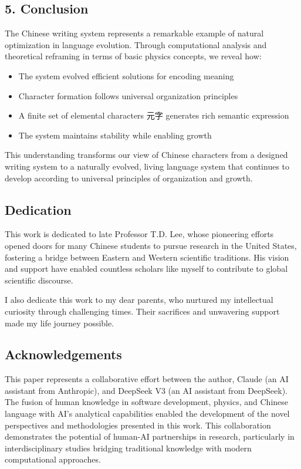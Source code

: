 \documentclass[
]{article}
\providecommand{\tightlist}{%
  \setlength{\itemsep}{0pt}\setlength{\parskip}{0pt}}
\begin{document}
\subsection{5. Conclusion}\label{conclusion}

The Chinese writing system represents a remarkable example of natural
optimization in language evolution. Through computational analysis and
theoretical reframing in terms of basic physics concepts, we reveal how:

\begin{itemize}
\tightlist
\item
  The system evolved efficient solutions for encoding meaning
\item
  Character formation follows universal organization principles
\item
  A finite set of elemental characters 元字 generates rich semantic
  expression
\item
  The system maintains stability while enabling growth
\end{itemize}

This understanding transforms our view of Chinese characters from a
designed writing system to a naturally evolved, living language system
that continues to develop according to universal principles of
organization and growth.

\subsection{Dedication}\label{dedication}

This work is dedicated to late Professor T.D. Lee, whose pioneering
efforts opened doors for many Chinese students to pursue research in the
United States, fostering a bridge between Eastern and Western scientific
traditions. His vision and support have enabled countless scholars like
myself to contribute to global scientific discourse.

I also dedicate this work to my dear parents, who nurtured my
intellectual curiosity through challenging times. Their sacrifices and
unwavering support made my life journey possible.

\subsection{Acknowledgements}\label{acknowledgements}

This paper represents a collaborative effort between the author, Claude
(an AI assistant from Anthropic), and DeepSeek V3 (an AI assistant from
DeepSeek). The fusion of human knowledge in software development,
physics, and Chinese language with AI's analytical capabilities enabled
the development of the novel perspectives and methodologies presented in
this work. This collaboration demonstrates the potential of human-AI
partnerships in research, particularly in interdisciplinary studies
bridging traditional knowledge with modern computational approaches.
\end{document}
